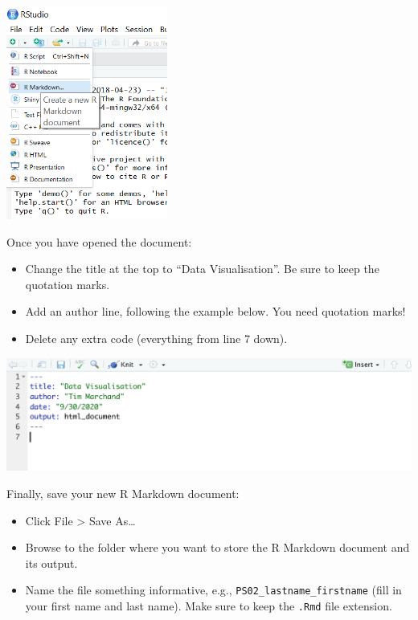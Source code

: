 \documentclass[]{article}
\providecommand{\tightlist}{%
  \setlength{\itemsep}{0pt}\setlength{\parskip}{0pt}}
\begin{document}
\includegraphics[width=2.08333in,height=\textheight]{figures/how.to.open.rmd.png}

Once you have opened the document:

\begin{itemize}
\tightlist
\item
  Change the title at the top to ``Data Visualisation''. Be sure to keep
  the quotation marks.
\item
  Add an author line, following the example below. You need quotation
  marks!
\item
  Delete any extra code (everything from line 7 down).
\end{itemize}

\includegraphics[width=1\textwidth,height=\textheight]{figures/set_up.png}

Finally, save your new R Markdown document:

\begin{itemize}
\tightlist
\item
  Click File \textgreater{} Save As\ldots{}
\item
  Browse to the folder where you want to store the R Markdown document
  and its output.
\item
  Name the file something informative, e.g.,
  \texttt{PS02\_lastname\_firstname} (fill in your first name and last
  name). Make sure to keep the \texttt{.Rmd} file extension.
\end{itemize}
\end{document}
